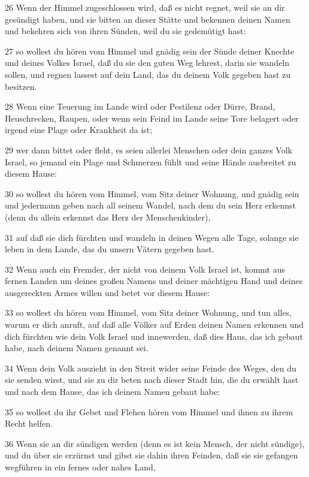 \par 26 Wenn der Himmel zugeschlossen wird, daß es nicht regnet, weil sie an dir gesündigt haben, und sie bitten an dieser Stätte und bekennen deinen Namen und bekehren sich von ihren Sünden, weil du sie gedemütigt hast:
\par 27 so wollest du hören vom Himmel und gnädig sein der Sünde deiner Knechte und deines Volkes Israel, daß du sie den guten Weg lehrest, darin sie wandeln sollen, und regnen lassest auf dein Land, das du deinem Volk gegeben hast zu besitzen.
\par 28 Wenn eine Teuerung im Lande wird oder Pestilenz oder Dürre, Brand, Heuschrecken, Raupen, oder wenn sein Feind im Lande seine Tore belagert oder irgend eine Plage oder Krankheit da ist;
\par 29 wer dann bittet oder fleht, es seien allerlei Menschen oder dein ganzes Volk Israel, so jemand ein Plage und Schmerzen fühlt und seine Hände ausbreitet zu diesem Hause:
\par 30 so wollest du hören vom Himmel, vom Sitz deiner Wohnung, und gnädig sein und jedermann geben nach all seinem Wandel, nach dem du sein Herz erkennst (denn du allein erkennst das Herz der Menschenkinder),
\par 31 auf daß sie dich fürchten und wandeln in deinen Wegen alle Tage, solange sie leben in dem Lande, das du unsern Vätern gegeben hast.
\par 32 Wenn auch ein Fremder, der nicht von deinem Volk Israel ist, kommt aus fernen Landen um deines großen Namens und deiner mächtigen Hand und deines ausgereckten Armes willen und betet vor diesem Hause:
\par 33 so wollest du hören vom Himmel, vom Sitz deiner Wohnung, und tun alles, warum er dich anruft, auf daß alle Völker auf Erden deinen Namen erkennen und dich fürchten wie dein Volk Israel und innewerden, daß dies Haus, das ich gebaut habe, nach deinem Namen genannt sei.
\par 34 Wenn dein Volk auszieht in den Streit wider seine Feinde des Weges, den du sie senden wirst, und sie zu dir beten nach dieser Stadt hin, die du erwählt hast und nach dem Hause, das ich deinem Namen gebaut habe:
\par 35 so wollest du ihr Gebet und Flehen hören vom Himmel und ihnen zu ihrem Recht helfen.
\par 36 Wenn sie an dir sündigen werden (denn es ist kein Mensch, der nicht sündige), und du über sie erzürnst und gibst sie dahin ihren Feinden, daß sie sie gefangen wegführen in ein fernes oder nahes Land,
